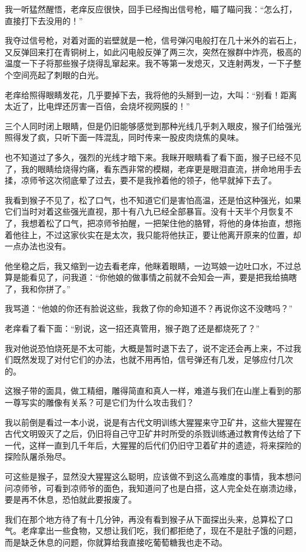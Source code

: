 我一听猛然醒悟，老痒反应很快，回手已经掏出信号枪，瞄了瞄问我：“怎么打，直接打下去没用的！”

我夺过信号枪，对着对面的岩壁就是一枪，信号弹闪电般打在几十米外的岩石上，又反弹回来打在青铜树上，如此闪电般反弹了两三次，突然在猴群中炸亮，极高的温度一下子将那些猴子烧得乱窜起来。我不等第一发熄灭，又连射两发，一下子整个空间亮起了刺眼的白光。

老痒给照得眼睛发花，几乎要掉下去，我将他的头掰到一边，大叫：“别看！距离太近了，比电焊还厉害一百倍，会烧坏视网膜的！”

三个人同时闭上眼睛，但是仍旧能够感觉到那种光线几乎刺入眼皮，猴子们给强光照得发了疯，只听下面一阵混乱，同时传来一股皮肉烧焦的臭味。

也不知道过了多久，强烈的光线才暗下来。我眯开眼睛看了看下面，猴子已经不见了，我的眼睛给烧得灼痛，看东西非常的模糊，老痒更是眼泪直流，拼命地用手去揉，凉师爷这次彻底晕了过去，要不是我拎着他的领子，他早就掉下去了。

我看到猴子不见了，松了口气，也不知道它们是害怕高温，还是怕这种强光，如果它们当时对着这些强光直视，那十有八九已经全部暴盲。没有十天半个月恢复不了，我想着松了口气，把凉师爷拍醒，一把架住他的胳臂，将他的身体抬直，想拖着他往上，不过这家伙实在是太次，我只能将他扶正，要让他离开原来的位置，却一点办法也没有。

他坐稳之后，我又缩到一边去看老痒，他眯着眼睛，一边骂娘一边吐口水，不过总算是能看见了，问我道：“你他娘的做事情之前就不会知会一声，要是把我给搞瞎了，我和你拼了。”

我骂道：“他娘的你还有脸说这些，我救了你的命知道不？再说你这不没瞎吗？”

老痒看了看下面：“别说，这一招还真管用，猴子跑了还是都烧死了？”

我对他说恐怕烧死是不太可能，大概是暂时退下去了，说不定还会再上来，不过我们既然发现了对付它们的办法，也就不用再怕，信号弹还有几发，足够应付几次的。

这猴子带的面具，做工精细，雕得简直和真人一样，难道与我们在山崖上看到的那一尊写实的雕像有关系？可是它们为什么攻击我们？

我以前倒是看过一本小说，说是有古代文明训练大猩猩来守卫矿井，这些大猩猩在古代文明毁灭了之后，仍旧将自己守卫矿井时所受的杀戮训练通过教育传达给了下一代，这样一直到几千年后，大猩猩的后代们仍旧守卫着矿井的遗迹，将来探险的探险队屠杀殆尽。

可这些是猴子，显然没大猩猩这么聪明，应该做不到这么高难度的事情，我本想问问凉师爷，可看到凉师爷的面色，我知道问了也是白搭，这人完全处在崩溃边缘，要是再不休息，恐怕就此要报废了。

我们在那个地方待了有十几分钟，再没有看到猴子从下面探出头来，总算松了口气。老痒拿出一些食物，又想让我们吃，我们都拒绝了，现在不是肚子饿的问题，而是缺乏休息的问题，你就算给我直接吃葡萄糖我也走不动。

